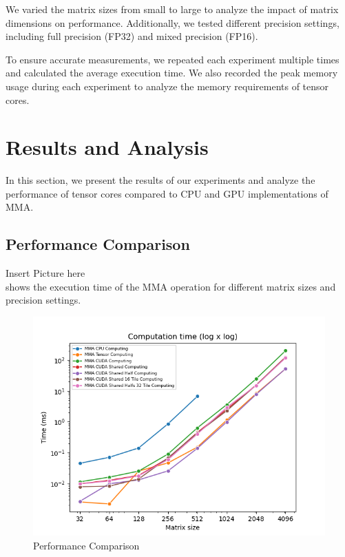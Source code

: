 \documentclass[conference]{IEEEtran}
\begin{document}
  We varied the matrix sizes from small to large to analyze the impact of matrix dimensions on 
  performance. Additionally, we tested different precision settings, including full precision (FP32)
  and mixed precision (FP16).
  
  To ensure accurate measurements, we repeated each experiment multiple times and calculated 
  the average execution time. We also recorded the peak memory usage during each experiment to 
  analyze the memory requirements of tensor cores.
  
  \section{Results and Analysis}\label{sec:results-analysis}
  
  In this section, we present the results of our experiments and analyze the performance of 
  tensor cores compared to CPU and GPU implementations of MMA.

  
  \subsection{Performance Comparison}\label{sec:performance-comparison}

  Insert Picture here\\
  shows the execution time of the MMA operation for different matrix sizes and precision settings.
  
  \begin{figure}[htbp]
    \centering
    \includegraphics[scale=0.4]{figures/Comp_time.png}
    \caption{Performance Comparison}
    \label{fig:performance-comparison}
  \end{figure}
\end{document}
